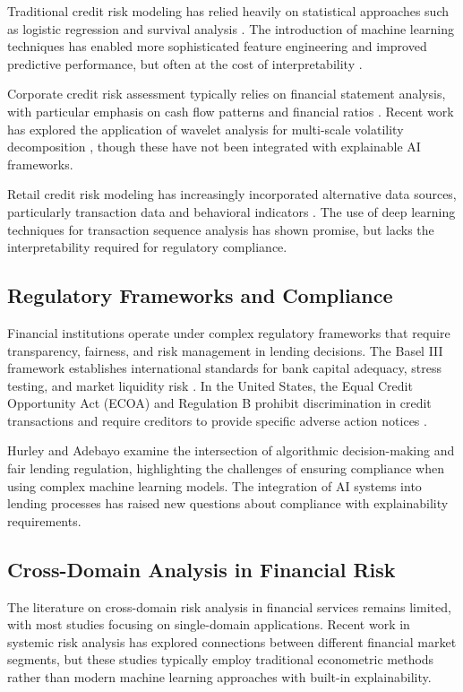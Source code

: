 \documentclass[a4paper,11pt,twoside]{article}
\newcommand{\0}{\Bf{0}}
\theoremstyle{definition}
\begin{document}
Traditional credit risk modeling has relied heavily on statistical approaches such as logistic regression and survival analysis \cite{ref11}. The introduction of machine learning techniques has enabled more sophisticated feature engineering and improved predictive performance, but often at the cost of interpretability \cite{ref12}.

Corporate credit risk assessment typically relies on financial statement analysis, with particular emphasis on cash flow patterns and financial ratios \cite{ref13}. Recent work has explored the application of wavelet analysis for multi-scale volatility decomposition \cite{ref14}, though these have not been integrated with explainable AI frameworks.

Retail credit risk modeling has increasingly incorporated alternative data sources, particularly transaction data and behavioral indicators \cite{ref15}. The use of deep learning techniques for transaction sequence analysis has shown promise, but lacks the interpretability required for regulatory compliance.

\subsection{Regulatory Frameworks and Compliance}

Financial institutions operate under complex regulatory frameworks that require transparency, fairness, and risk management in lending decisions. The Basel III framework establishes international standards for bank capital adequacy, stress testing, and market liquidity risk \cite{ref16}. In the United States, the Equal Credit Opportunity Act (ECOA) and Regulation B prohibit discrimination in credit transactions and require creditors to provide specific adverse action notices \cite{ref17}.

Hurley and Adebayo \cite{ref18} examine the intersection of algorithmic decision-making and fair lending regulation, highlighting the challenges of ensuring compliance when using complex machine learning models. The integration of AI systems into lending processes has raised new questions about compliance with explainability requirements.

\subsection{Cross-Domain Analysis in Financial Risk}

The literature on cross-domain risk analysis in financial services remains limited, with most studies focusing on single-domain applications. Recent work in systemic risk analysis has explored connections between different financial market segments, but these studies typically employ traditional econometric methods rather than modern machine learning approaches with built-in explainability.
\end{document}
